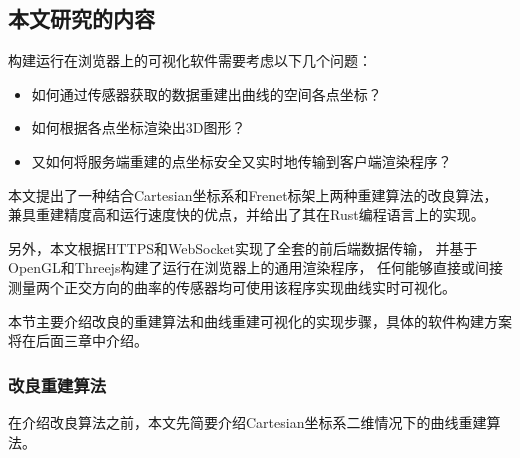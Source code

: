 \subsection{本文研究的内容}

构建运行在浏览器上的可视化软件需要考虑以下几个问题：

\begin{itemize}
\item 如何通过传感器获取的数据重建出曲线的空间各点坐标？
\item 如何根据各点坐标渲染出3D图形？
\item 又如何将服务端重建的点坐标安全又实时地传输到客户端渲染程序？
\end{itemize}

本文提出了一种结合Cartesian坐标系和Frenet标架上两种重建算法的改良算法，
兼具重建精度高和运行速度快的优点，并给出了其在Rust编程语言上的实现。

另外，本文根据HTTPS和WebSocket实现了全套的前后端数据传输，
并基于OpenGL和Threejs构建了运行在浏览器上的通用渲染程序，
任何能够直接或间接测量两个正交方向的曲率的传感器均可使用该程序实现曲线实时可视化。

本节主要介绍改良的重建算法和曲线重建可视化的实现步骤，具体的软件构建方案将在后面三章中介绍。

\subsubsection{改良重建算法}

在介绍改良算法之前，本文先简要介绍Cartesian坐标系二维情况下的曲线重建算法。

